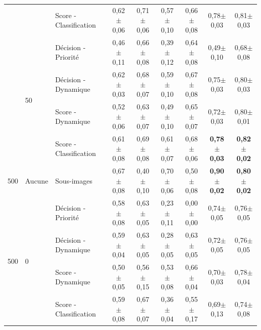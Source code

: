 \begin{landscape}
\begin{table}[]
\begin{tabular}{lllcccccc}
							        &                               & Score - Classification    & 0,62$\pm$0,06         & 0,71$\pm$0,06     & 0,57$\pm$0,10         & 0,66$\pm$0,08     & 0,78$\pm$0,03         & 0,81$\pm$0,03         \\ \cline{2-9}
							        & \multirow{4}{*}{50}           & Décision - Priorité       & 0,46$\pm$0,11         & 0,66$\pm$0,08     & 0,39$\pm$0,12         & 0,64$\pm$0,08     & 0,49$\pm$0,10         & 0,68$\pm$0,08         \\
							        &                               & Décision - Dynamique      & 0,62$\pm$0,03         & 0,68$\pm$0,07     & 0,59$\pm$0,10         & 0,67$\pm$0,08     & 0,75$\pm$0,03         & 0,80$\pm$0,03         \\
							        &                               & Score - Dynamique         & 0,52$\pm$0,06         & 0,63$\pm$0,07     & 0,49$\pm$0,10         & 0,65$\pm$0,07     & 0,72$\pm$0,03         & 0,80$\pm$0,01         \\ \rowcolor[HTML]{E7E6E6}
		                            &                               & Score - Classification    & 0,61$\pm$0,08         & 0,69$\pm$0,08     & 0,61$\pm$0,07         & 0,68$\pm$0,06     & \textbf{0,78$\pm$0,03}& \textbf{0,82$\pm$0,02}\\ \midrule
		500                         & Aucune                        & Sous-images               & 0,67$\pm$0,08         & 0,40$\pm$0,10     & 0,70$\pm$0,06         & 0,50$\pm$0,08     & \textbf{0,90$\pm$0,02}& \textbf{0,80$\pm$0,02}\\ \midrule
		\multirow{12}{*}{500}       & \multirow{4}{*}{0}            & Décision - Priorité       & 0,58$\pm$0,08         & 0,63$\pm$0,05     & 0,23$\pm$0,11         & 0,00$\pm$0,00     & 0,74$\pm$0,05         & 0,76$\pm$0,05         \\
							        &                               & Décision - Dynamique      & 0,59$\pm$0,04         & 0,63$\pm$0,05     & 0,28$\pm$0,05         & 0,63$\pm$0,05     & 0,72$\pm$0,05         & 0,76$\pm$0,05         \\
							        &                               & Score - Dynamique         & 0,50$\pm$0,05         & 0,56$\pm$0,15     & 0,53$\pm$0,08         & 0,66$\pm$0,04     & 0,70$\pm$0,03         & 0,78$\pm$0,04         \\
							        &                               & Score - Classification    & 0,59$\pm$0,08         & 0,67$\pm$0,07     & 0,36$\pm$0,04         & 0,55$\pm$0,17     & 0,69$\pm$0,13         & 0,74$\pm$0,08         \\ \cline{2-9}

\end{tabular}
\end{table}
\end{landscape}
